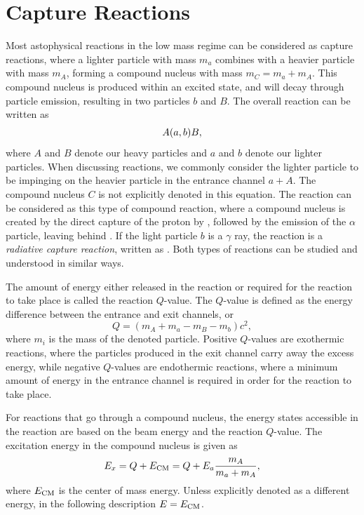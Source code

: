 
\section{Capture Reactions}
\label{sec:01-capture-reactions}

Most astophysical reactions in the low mass regime can be considered as
capture reactions, where a lighter particle with mass $m_a$ combines
with a heavier particle with mass $m_A$, forming a compound nucleus with
mass $m_C = m_a + m_A$. This compound nucleus is produced within an
excited state, and will decay through particle emission, resulting in
two particles $b$ and $B$. The overall reaction can be written as
\[
    A(a,b)B,
\]
where $A$ and $B$ denote our heavy particles and $a$ and $b$ denote our
lighter particles. When discussing reactions, we commonly consider the
lighter particle to be impinging on the heavier particle in the entrance
channel $a + A$. The compound nucleus $C$ is not explicitly denoted in
this equation. The reaction \alpa{} can be considered as this type of
compound reaction, where a compound nucleus  is created by
the direct capture of the proton by , followed by the
emission of the $\alpha$ particle, leaving behind . If the
light particle $b$ is a $\gamma$ ray, the reaction is a \emph{radiative
capture reaction}, written as . Both types of
reactions can be studied and understood in similar ways.

The amount of energy either released in the reaction or required for the
reaction to take place is called the reaction $Q$-value. The $Q$-value
is defined as the energy difference between the entrance and exit
channels, or
\[
    Q = (m_A + m_a - m_B - m_b)c^2,
\]
where $m_i$ is the mass of the denoted particle. Positive $Q$-values are
exothermic reactions, where the particles produced in the exit channel
carry away the excess energy, while negative $Q$-values are endothermic
reactions, where a minimum amount of energy in the entrance channel is
required in order for the reaction to take place.

For reactions that go through a compound nucleus, the energy states
accessible in the reaction are based on the beam energy and the reaction
$Q$-value. The excitation energy in the compound nucleus is given as
\[
    E_x = Q + E_{\rm CM} = Q + E_a\frac{m_A}{m_a + m_A},
\]
where $E_{\rm CM}$ is the center of mass energy. Unless explicitly
denoted as a different energy, in the following description $E = E_{\rm
CM}$.


